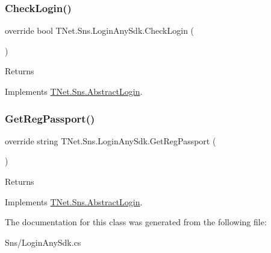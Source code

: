 \subsubsection{\texorpdfstring{Check\+Login()}{CheckLogin()}}
{\footnotesize\ttfamily override bool T\+Net.\+Sns.\+Login\+Any\+Sdk.\+Check\+Login (\begin{DoxyParamCaption}{ }\end{DoxyParamCaption})\hspace{0.3cm}{\ttfamily [virtual]}}





\begin{DoxyReturn}{Returns}

\end{DoxyReturn}


Implements \mbox{\hyperlink{class_t_net_1_1_sns_1_1_abstract_login_a6b5dac3d6d46efb7b1e4049e674105e5}{T\+Net.\+Sns.\+Abstract\+Login}}.

\mbox{\label{class_t_net_1_1_sns_1_1_login_any_sdk_a70ac7a7b2956ddc6c3d9c7bbba4d99c5}} 
\subsubsection{\texorpdfstring{Get\+Reg\+Passport()}{GetRegPassport()}}
{\footnotesize\ttfamily override string T\+Net.\+Sns.\+Login\+Any\+Sdk.\+Get\+Reg\+Passport (\begin{DoxyParamCaption}{ }\end{DoxyParamCaption})\hspace{0.3cm}{\ttfamily [virtual]}}





\begin{DoxyReturn}{Returns}

\end{DoxyReturn}


Implements \mbox{\hyperlink{class_t_net_1_1_sns_1_1_abstract_login_a3930eb564bb4804e1b646d749f20907a}{T\+Net.\+Sns.\+Abstract\+Login}}.



The documentation for this class was generated from the following file\+:\begin{DoxyCompactItemize}
\item 
Sns/Login\+Any\+Sdk.\+cs\end{DoxyCompactItemize}

